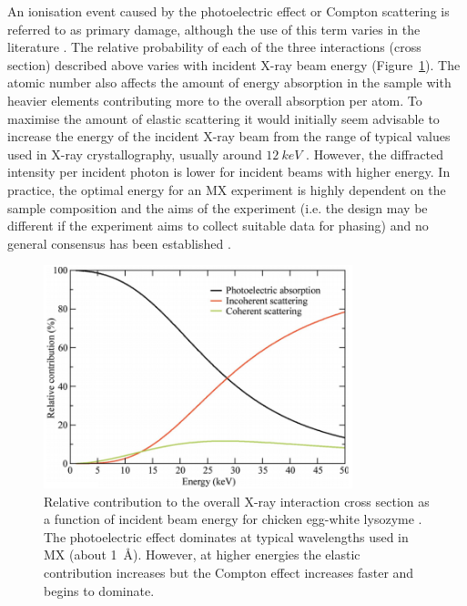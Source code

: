         An ionisation event caused by the photoelectric effect or Compton scattering is referred to as primary damage, although the use of this term varies in the literature \cite{garman2010}.
        The relative probability of each of the three interactions (cross section) described above varies with incident X-ray beam energy (Figure~\ref{fig:Relative Absorption Probabilities}). The atomic number also affects the amount of energy absorption in the sample with heavier elements contributing more to the overall absorption per atom.
        To maximise the amount of elastic scattering it would initially seem advisable to increase the energy of the incident X-ray beam from the range of typical values used in X-ray crystallography, usually around $12\ keV$ \cite{pait2010}.
        However, the diffracted intensity per incident photon is lower for incident beams with higher energy. In practice, the optimal energy for an MX experiment is highly dependent on the sample composition and the aims of the experiment (i.e. the design may be different if the experiment aims to collect suitable data for phasing) and no general consensus has been established \cite{pait2010}.
        \begin{figure}
            \centering
            \includegraphics[width=0.8\textwidth]{figures/introduction/relativeinteractions.png}
            \caption{Relative contribution to the overall X-ray interaction cross section as a function of incident beam energy for chicken egg-white lysozyme \cite{pait2010}. The photoelectric effect dominates at typical wavelengths used in MX (about 1\ \AA). However, at higher energies the elastic contribution increases but the Compton effect increases faster and begins to dominate.}
            \label{fig:Relative Absorption Probabilities}
        \end{figure}

